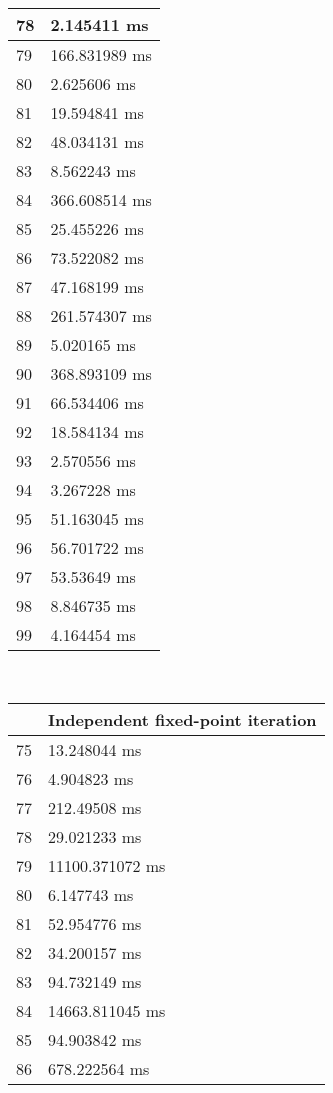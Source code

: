 \begin{multicols}{2}
\begin{tabular}{|l|l|}
		78 & 2.145411 ms \\ \hline
		79 & 166.831989 ms \\ \hline
		80 & 2.625606 ms \\ \hline
		81 & 19.594841 ms \\ \hline
		82 & 48.034131 ms \\ \hline
		83 & 8.562243 ms \\ \hline
		84 & 366.608514 ms \\ \hline
		85 & 25.455226 ms \\ \hline
		86 & 73.522082 ms \\ \hline
		87 & 47.168199 ms \\ \hline
		88 & 261.574307 ms \\ \hline
		89 & 5.020165 ms \\ \hline
		90 & 368.893109 ms \\ \hline
		91 & 66.534406 ms \\ \hline
		92 & 18.584134 ms \\ \hline
		93 & 2.570556 ms \\ \hline
		94 & 3.267228 ms \\ \hline
		95 & 51.163045 ms \\ \hline
		96 & 56.701722 ms \\ \hline
		97 & 53.53649 ms \\ \hline
		98 & 8.846735 ms \\ \hline
		99 & 4.164454 ms \\ \hline
	\end{tabular}\\
	\begin{tabular}{|l|l|}
		\hline
		& Independent fixed-point iteration \\ \hline
		75 & 13.248044 ms \\ \hline
		76 & 4.904823 ms \\ \hline
		77 & 212.49508 ms \\ \hline
		78 & 29.021233 ms \\ \hline
		79 & 11100.371072 ms \\ \hline
		80 & 6.147743 ms \\ \hline
		81 & 52.954776 ms \\ \hline
		82 & 34.200157 ms \\ \hline
		83 & 94.732149 ms \\ \hline
		84 & 14663.811045 ms \\ \hline
		85 & 94.903842 ms \\ \hline
		86 & 678.222564 ms \\ \hline

\end{tabular}
\end{multicols}
